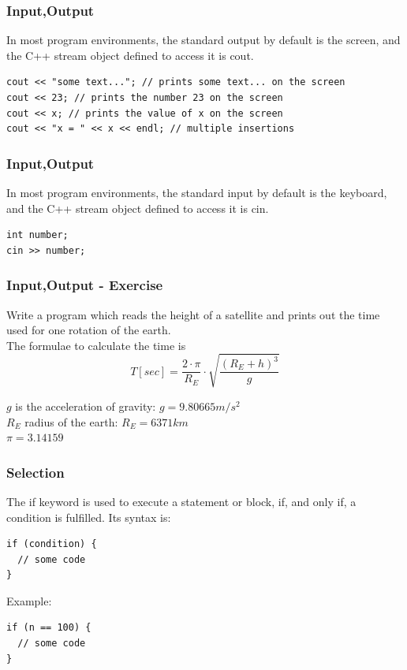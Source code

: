 \begin{frame}[fragile]
  \frametitle{Input,Output}
  In most program environments, the standard output by default is the screen,
  and the C++ stream object defined to access it is cout.
  {\scriptsize
\begin{lstlisting}
cout << "some text..."; // prints some text... on the screen
cout << 23; // prints the number 23 on the screen
cout << x; // prints the value of x on the screen
cout << "x = " << x << endl; // multiple insertions
\end{lstlisting}
  }
\end{frame}

\begin{frame}[fragile]
  \frametitle{Input,Output}
  In most program environments, the standard input by default is the keyboard,
  and the C++ stream object defined to access it is cin.
\begin{lstlisting}
int number;
cin >> number;
\end{lstlisting}
\end{frame}

\begin{frame}[fragile]
  \frametitle{Input,Output - Exercise}
  \begin{exercise}
  Write a program which reads the height of a satellite and prints out
  the time used for one rotation of the earth.\\
  The formulae to calculate the time is
  \begin{displaymath}
T[sec] = \frac{2 \cdot \pi}{R_{E}} \cdot \sqrt{\frac{(R_{E}+h)^{3}}{g}}
\end{displaymath}

$g$ is the acceleration of gravity: $g = 9.80665 m/s^{2}$\\
$R_{E}$ radius of the earth: $R_{E} = 6371 km$\\
$\pi = 3.14159$\\
  \end{exercise}
\end{frame}

\begin{frame}[fragile]
  \frametitle{Selection}
  The if keyword is used to execute a statement or block, if, and only if, a condition is fulfilled. Its syntax is:
\begin{lstlisting}
if (condition) {
  // some code
}
\end{lstlisting}
Example:
\begin{lstlisting}
if (n == 100) {
  // some code
}
\end{lstlisting}
\end{frame}

